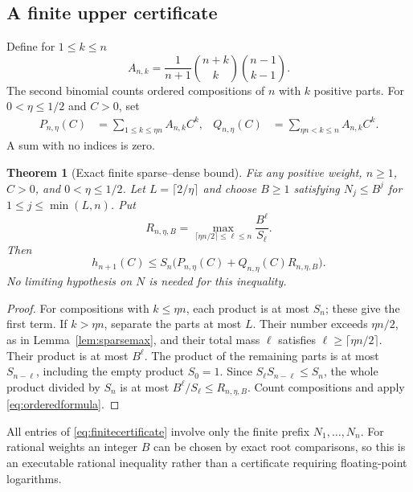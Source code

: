 \documentclass[11pt,a4paper]{article}
\numberwithin{equation}{section}
\newtheorem{theorem}{Theorem}[section]
\theoremstyle{definition}
\theoremstyle{remark}
\begin{document}
\subsection{A finite upper certificate}

Define for $1\le k\le n$
\begin{equation}
 A_{n,k}=\frac1{n+1}\binom{n+k}{k}\binom{n-1}{k-1}.
 \label{eq:Ank}
\end{equation}
The second binomial counts ordered compositions of $n$ with $k$ positive
parts. For $0<\eta\le1/2$ and $C>0$, set
\begin{align}
 P_{n,\eta}(C)&=\sum_{1\le k\le\eta n}A_{n,k}C^k,
 &Q_{n,\eta}(C)&=\sum_{\eta n<k\le n}A_{n,k}C^k.
 \label{eq:PQ}
\end{align}
A sum with no indices is zero.

\begin{theorem}[Exact finite sparse--dense bound]
\label{thm:finitecertificate}
Fix any positive weight, $n\ge1$, $C>0$, and $0<\eta\le1/2$.
Let $L=\lceil2/\eta\rceil$ and choose $B\ge1$ satisfying
$N_j\le B^j$ for $1\le j\le\min(L,n)$. Put
\begin{equation}
 R_{n,\eta,B}=
 \max_{\lceil\eta n/2\rceil\le\ell\le n}\frac{B^\ell}{S_\ell}.
 \label{eq:Rtail}
\end{equation}
Then
\begin{equation}
 \boxed{\displaystyle
 h_{n+1}(C)\le S_n
 \bigl(P_{n,\eta}(C)+Q_{n,\eta}(C)R_{n,\eta,B}\bigr).}
 \label{eq:finitecertificate}
\end{equation}
No limiting hypothesis on $N$ is needed for this inequality.
\end{theorem}
\begin{proof}
For compositions with $k\le\eta n$, each product is at most $S_n$;
these give the first term. If $k>\eta n$, separate the parts at most
$L$. Their number exceeds $\eta n/2$, as in
Lemma~\ref{lem:sparsemax}, and their total mass $\ell$ satisfies
$\ell\ge\lceil\eta n/2\rceil$. Their product is at most $B^\ell$.
The product of the remaining parts is at most $S_{n-\ell}$, including
the empty product $S_0=1$. Since
$S_\ell S_{n-\ell}\le S_n$, the whole product divided by $S_n$ is at
most $B^\ell/S_\ell\le R_{n,\eta,B}$. Count compositions and apply
\eqref{eq:orderedformula}.
\end{proof}

All entries of \eqref{eq:finitecertificate} involve only the finite
prefix $N_1,\ldots,N_n$. For rational weights an integer $B$ can be
chosen by exact root comparisons, so this is an executable rational
inequality rather than a certificate requiring floating-point logarithms.
\end{document}
